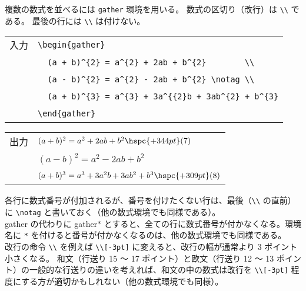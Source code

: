 複数の数式を並べるには \verb`gather` 環境を用いる。
数式の区切り（改行）は \verb`\\` である。
最後の行には \verb`\\` は付けない。
\begin{longtable}[l]{@{}l|l@{}}
  入力 & \verb`\begin{gather}`                                     \\
  \    & \verb`  (a + b)^{2} = a^{2} + 2ab + b^{2}        \\`      \\
  \    & \verb`  (a - b)^{2} = a^{2} - 2ab + b^{2} \notag \\`      \\
  \    & \verb`  (a + b)^{3} = a^{3} + 3a^{{2}b + 3ab^{2} + b^{3}` \\
  \    & \verb`\end{gather}`                                       \\
\end{longtable}
\begin{longtable}[l]{@{}l|l@{}}
  出力 & $(a + b)^{2} = a^{2} + 2ab + b^{2} \hspc{+344pt} (\text{7})$               \\
  \    & $(a - b)^{2} = a^{2} - 2ab + b^{2}$                                        \\
  \    & $(a + b)^{3} = a^{3} + 3a^{2}b + 3ab^{2} + b^{3} \hspc{+309pt} (\text{8})$ \\
\end{longtable}
各行に数式番号が付加されるが、番号を付けたくない行は、最後（\verb`\\` の直前）に \verb`\notag` と書いておく（他の数式環境でも同様である）。\\

gather の代わりに gather$*$ とすると、全ての行に数式番号が付かなくなる。環境名に \verb`*` を付けると番号が付かなくなるのは、他の数式環境でも同様である。\\

改行の命令 \verb`\\` を例えば \verb`\\[-3pt]` に変えると、改行の幅が通常より 3 ポイント小さくなる。
和文（行送り 15 ～ 17 ポイント）と欧文（行送り 12 ～ 13 ポイント）の一般的な行送りの違いを考えれば、和文の中の数式は改行を \verb`\\[-3pt]` 程度にする方が適切かもしれない（他の数式環境でも同様）。\\


